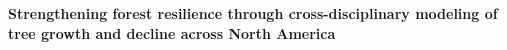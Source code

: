 \documentclass[11pt]{article}
\begin{document}

\renewcommand{\refname}{\CHead{}}


\begin{center}
{\bf Strengthening forest resilience through cross-disciplinary modeling of \\ tree growth and decline across North America}
\end{center}


\end{document}
